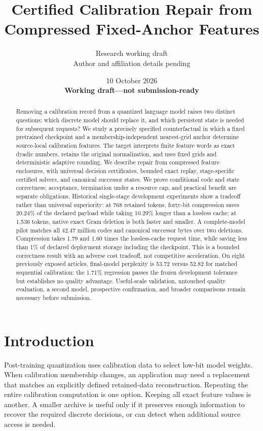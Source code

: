 \documentclass[10pt,twocolumn,letterpaper]{article}
\title{Certified Calibration Repair from Compressed Fixed-Anchor Features}
\author{Research working draft\\Author and affiliation details pending}
\date{10 October 2026\\\textbf{Working draft---not submission-ready}}
\begin{document}
\maketitle

\begin{abstract}
Removing a calibration record from a quantized language model raises two distinct
questions: which discrete model should replace it, and which persistent state is
needed for subsequent requests? We study a precisely specified counterfactual in
which a fixed pretrained checkpoint and a membership-independent nearest-grid
anchor determine source-local calibration features. The target interprets finite
feature words as exact dyadic numbers, retains the original normalization, and
uses fixed grids and deterministic adaptive rounding. We describe repair from
compressed feature enclosures, with universal decision certificates, bounded
exact replay, stage-specific certified solvers, and canonical successor states.
We prove conditional code and state correctness; acceptance, termination under a
resource cap, and practical benefit are separate obligations. Historical
single-stage development experiments show a tradeoff rather than universal
superiority: at 768 retained tokens, forty-bit compression saves 20.24\% of the
declared payload while taking 10.29\% longer than a lossless cache; at 1,536 tokens,
native exact Gram deletion is both faster and smaller. A complete-model pilot
matches all 42.47 million codes and canonical successor bytes over two deletions.
Compression takes 1.79 and 1.60 times the lossless-cache request time, while saving
less than 1\% of declared deployment storage including the checkpoint. This is a
bounded correctness result with an adverse cost tradeoff, not competitive
acceleration. On eight previously exposed articles, final-model perplexity is
53.72 versus 52.82 for matched sequential calibration: the 1.71\% regression
passes the frozen development tolerance but establishes no quality advantage.
Useful-scale validation, untouched quality evaluation, a second model,
prospective confirmation, and broader comparisons remain necessary before
submission.
\end{abstract}

\section{Introduction}
Post-training quantization uses calibration data to select low-bit model weights.
When calibration membership changes, an application may need a replacement that
matches an explicitly defined retained-data reconstruction. Repeating the entire
calibration computation is one option. Keeping all exact feature values is
another. A smaller archive is useful only if it preserves enough information to
recover the required discrete decisions, or can detect when additional source
access is needed.
\end{document}
